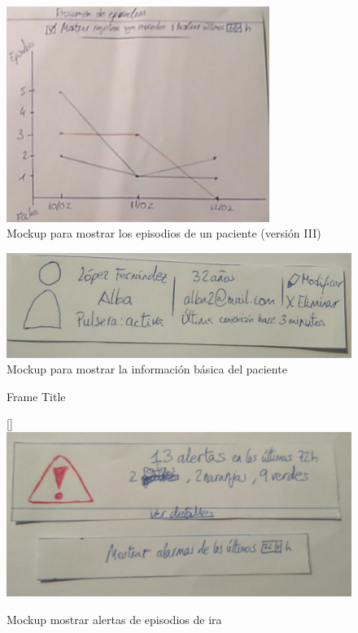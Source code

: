 \begin{figure}
    \centering
    \begin{minipage}{.45\textwidth}
        \centering
        \includegraphics[width=0.8\linewidth, height=7cm]{Imagenes/anxA7-3.png}
        \caption[Mockup para mostrar los episodios de un paciente (versión III)]{Mockup para mostrar los episodios de un paciente (versión III)}
        \label{fig:c4:mockup15}
    \end{minipage}
\end{figure}


\begin{figure}[!htbp]
    \centering
    \includegraphics[scale=0.3]{Imagenes/anxA8.jpg}
    \caption[Mockup para mostrar la información básica del paciente]{Mockup para mostrar la información básica del paciente}
    \label{fig:c4:mockup16}
\end{figure}

\begin{figure}[!htbp]
    \centering
\begin{frame}{Frame Title}
    
\end{frame}[]    \includegraphics[scale=0.3]{Imagenes/anxA9.jpg}
    \caption[Mockup mostrar alertas de episodios de ira]{Mockup mostrar alertas de episodios de ira}
    \label{fig:c4:mockup17}
\end{figure}

